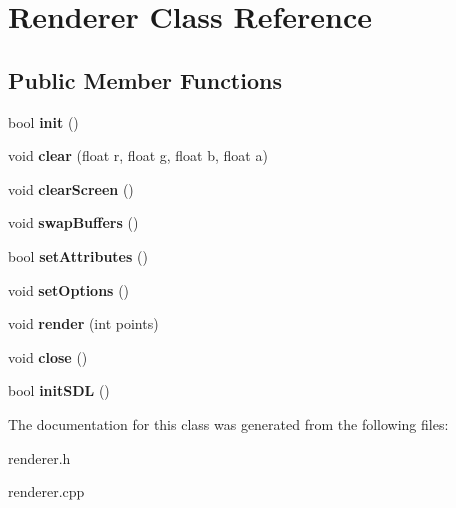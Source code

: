 \hypertarget{classRenderer}{}\section{Renderer Class Reference}
\label{classRenderer}
\subsection*{Public Member Functions}
\begin{DoxyCompactItemize}
\item 
\mbox{\label{classRenderer_a628ba0693fd83815acac8c69b7dcf9f0}} 
bool {\bfseries init} ()
\item 
\mbox{\label{classRenderer_a4540c0a5c74fb0e40396c37d39e94968}} 
void {\bfseries clear} (float r, float g, float b, float a)
\item 
\mbox{\label{classRenderer_a3b5f86a8916b9075e7b852a9fd5d37a2}} 
void {\bfseries clear\+Screen} ()
\item 
\mbox{\label{classRenderer_afebd47ef1e1cee08c95a7b8e19158180}} 
void {\bfseries swap\+Buffers} ()
\item 
\mbox{\label{classRenderer_aacd99421629c40bcc784bd0cafd5bb86}} 
bool {\bfseries set\+Attributes} ()
\item 
\mbox{\label{classRenderer_afe68ed2d02a6989998f5d74f97eb8b98}} 
void {\bfseries set\+Options} ()
\item 
\mbox{\label{classRenderer_a0cec78d7188061792941e6f40090d658}} 
void {\bfseries render} (int points)
\item 
\mbox{\label{classRenderer_aed9523f40edd38a2aae2ddbef43312b7}} 
void {\bfseries close} ()
\item 
\mbox{\label{classRenderer_a4bdcf3b0c86787bf943c5f6af80ee76e}} 
bool {\bfseries init\+S\+DL} ()
\end{DoxyCompactItemize}


The documentation for this class was generated from the following files\+:\begin{DoxyCompactItemize}
\item 
renderer.\+h\item 
renderer.\+cpp\end{DoxyCompactItemize}
